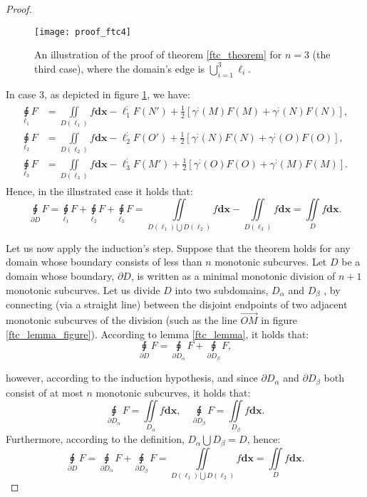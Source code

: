 \documentclass[11pt]{book}
\begin{document}
\begin{proof}
\begin{figure}
\texttt{[image: proof\_ftc4]}
\caption{An illustration of the proof of theorem \ref{ftc_theorem} for $n=3$ (the third case), where the domain’s edge is $\bigcup_{i=1}^{3}\ell_{i}$.}
\label{ftc_proof4_fig}
\end{figure}

In case 3, as depicted in figure \ref{ftc_proof4_fig}, we have:
\begin{align}
\begin{aligned}
\underset{\ell_{1}}{\sqint}F & =\underset{D\left(\ell_{1}\right)}{\iint}f\boldsymbol{dx}-\ell_{1}^{;}F\left(N'\right)+\frac{1}{2}\left[\gamma^{;}\left(M\right)F\left(M\right)+\gamma^{;}\left(N\right)F\left(N\right)\right],\\
\underset{\ell_{2}}{\sqint}F & =\underset{D\left(\ell_{2}\right)}{\iint}f\boldsymbol{dx}-\ell_{2}^{;}F\left(O'\right)+\frac{1}{2}\left[\gamma^{;}\left(N\right)F\left(N\right)+\gamma^{;}\left(O\right)F\left(O\right)\right],\\
\underset{\ell_{3}}{\sqint}F & =\underset{D\left(\ell_{3}\right)}{\iint}f\boldsymbol{dx}-\ell_{3}^{;}F\left(M'\right)+\frac{1}{2}\left[\gamma^{;}\left(O\right)F\left(O\right)+\gamma^{;}\left(M\right)F\left(M\right)\right].
\end{aligned}
\end{align}
Hence, in the illustrated case it holds that:
\[
\underset{\partial D}{\sqint}F=\underset{\ell_{1}}{\sqint}F+\underset{\ell_{2}}{\sqint}F+\underset{\ell_{3}}{\sqint}F=\underset{D\left(\ell_{1}\right)\bigcup D\left(\ell_{2}\right)}{\iint}f\boldsymbol{dx}-\underset{D\left(\ell_{3}\right)}{\iint}f\boldsymbol{dx}=\underset{D}{\iint}f\boldsymbol{dx}.
\]

Let us now apply the induction's step. Suppose that the theorem holds
for any domain whose boundary consists of less than $n$ monotonic
subcurves. Let $D$ be a domain whose boundary, $\partial D$, is
written as a minimal monotonic division of $n+1$ monotonic subcurves.
Let us divide $D$ into two subdomains, $D_{\alpha}$ and $D_{\beta}$
, by connecting (via a straight line) between the disjoint endpoints
of two adjacent monotonic subcurves of the division (such as the line
$\overrightarrow{OM}$ in figure \ref{ftc_lemma_figure}). According to lemma \ref{ftc_lemma}, it holds
that:
\[
\underset{\partial D}{\sqint}F=\underset{\partial D_{\alpha}}{\sqint}F+\underset{\partial D_{\beta}}{\sqint}F,
\]

however, according to the induction hypothesis, and since $\partial D_{\alpha}$
and $\partial D_{\beta}$ both consist of at most $n$ monotonic subcurves,
it holds that:
\[
\underset{\partial D_{\alpha}}{\sqint}F=\underset{D_{\alpha}}{\iint}f\boldsymbol{dx},\quad\underset{\partial D_{\beta}}{\sqint}F=\underset{D_{\beta}}{\iint}f\boldsymbol{dx}.
\]
Furthermore, according to the definition, $D_{\alpha}\bigcup D_{\beta}=D$,
hence:
\[
\underset{\partial D}{\sqint}F=\underset{\partial D_{\alpha}}{\sqint}F+\underset{\partial D_{\beta}}{\sqint}F=\underset{D\left(\ell_{1}\right)\bigcup D\left(\ell_{2}\right)}{\iint}f\boldsymbol{dx}=\underset{D}{\iint}f\boldsymbol{dx}.
\]
\end{proof}
\end{document}
